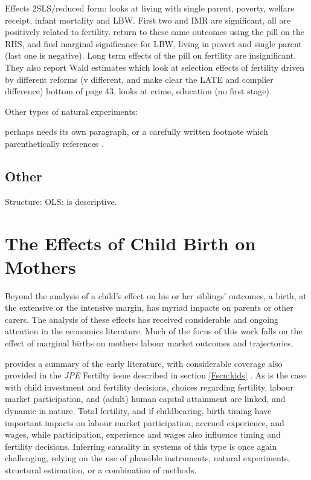 Effects 2SLS/reduced form: \citet{Gruberetal1999} looks at living with single 
parent, poverty, welfare receipt, infant mortality and LBW.  First two and IMR 
are significant, all are positively related to fertility. 
\citet{OltmansHungerman2012} return to these same outcomes using the pill on the
RHS, and find marginal significance for LBW, living in povert and single parent
(last one is negative).  Long term effects of the pill on fertility are 
insignificant.  They also report Wald estimates which look at selection effects
of fertility driven by different reforms (v different, and make clear the LATE
and complier difference) bottom of page 43. \citet{PopEleches2006} looks at 
crime, education (no first stage).

Other types of natural experiments: \citet{RosenzweigZhang2009,Qian2009,
Hossain1989}

\citet{BleakleyLange2009} perhaps needs its own paragraph, or a carefully 
written footnote which parenthetically references \citet{AcemogluJohnson2007}.

\subsection{Other}
Structure: \citet{RosenzweigWolpin1995,RosenzweigSchultz1985,
RosenzweigWolpin1980b}
OLS: \citet{Hanushek1992} is descriptive. \citet{Desai1995}

\section{The Effects of Child Birth on Mothers}
\label{Fscn:mothers}
Beyond the analysis of a child's effect on his or her siblings' outcomes, a
birth, at the extensive or the intensive margin, has myriad impacts on parents
or other carers.  The analysis of these effects has received considerable and 
ongoing attention in the economics literature.  Much of the focus of this work
falls on the effect of marginal births on mothers labour market outcomes and
trajectories.

\citet{FleisherRhodes1979} provides a summary of the early literature, with 
considerable coverage also provided in the \emph{JPE} Fertilty issue described
in section \ref{Fscn:kids} \citep{Willis1973,Gronau1973}.  As is the case with
child investment and fertility decisions, choices regarding fertility, labour
market participation, and (adult) human capital attainment are linked, and 
dynamic in nature.  Total fertility, and if childbearing, birth timing have
important impacts on labour market participation, accrued experience, and
wages, while participation, experience and wages also influence timing and
fertility decisions.  Inferring causality in systems of this type is once again
challenging, relying on the use of plausible instruments, natural experiments,
structural estimation, or a combination of methods.

